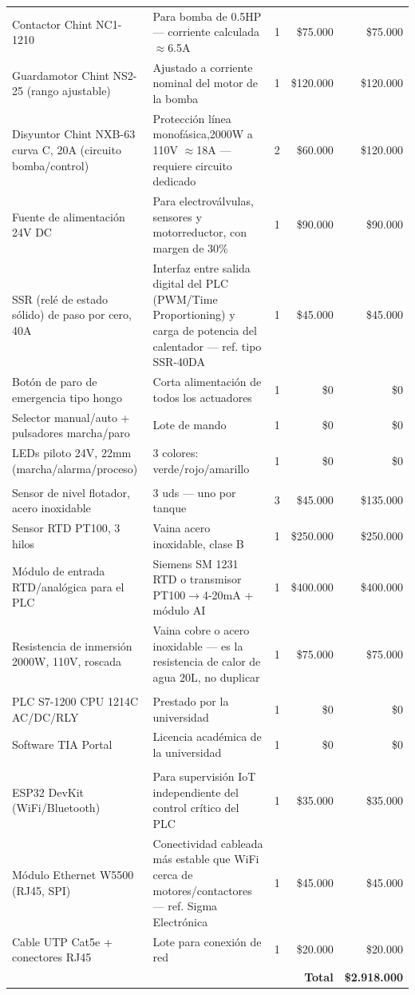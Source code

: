 \begin{longtable}{@{}p{4.6cm}p{6cm}crr@{}}
\addlinespace[2pt]
Contactor Chint NC1-1210 & Para bomba de 0.5HP --- corriente calculada $\approx$6.5A & 1 & \$75.000 & \$75.000 \\
Guardamotor Chint NS2-25 (rango ajustable) & Ajustado a corriente nominal del motor de la bomba & 1 & \$120.000 & \$120.000 \\
Disyuntor Chint NXB-63 curva C, 20A (circuito bomba/control) & Protección línea monofásica,2000W a 110V $\approx$18A --- requiere circuito dedicado & 2 & \$60.000 & \$120.000 \\
Fuente de alimentación 24V DC & Para electroválvulas, sensores y motorreductor, con margen de 30\% & 1 & \$90.000 & \$90.000 \\
SSR (relé de estado sólido) de paso por cero, 40A & Interfaz entre salida digital del PLC (PWM/Time Proportioning) y carga de potencia del calentador --- ref. tipo SSR-40DA & 1 & \$45.000 & \$45.000 \\
Botón de paro de emergencia tipo hongo & Corta alimentación de todos los actuadores & 1 & \$0 & \$0 \\
Selector manual/auto + pulsadores marcha/paro & Lote de mando & 1 & \$0 & \$0 \\
LEDs piloto 24V, 22mm (marcha/alarma/proceso) & 3 colores: verde/rojo/amarillo & 1 & \$0 & \$0 \\
\addlinespace
\multicolumn{5}{@{}l}{\textbf{Instrumentación}} \\
\addlinespace[2pt]
Sensor de nivel flotador, acero inoxidable & 3 uds --- uno por tanque & 3 & \$45.000 & \$135.000 \\
Sensor RTD PT100, 3 hilos & Vaina acero inoxidable, clase B & 1 & \$250.000 & \$250.000 \\
Módulo de entrada RTD/analógica para el PLC & Siemens SM 1231 RTD o transmisor PT100$\rightarrow$4-20mA + módulo AI & 1 & \$400.000 & \$400.000 \\
Resistencia de inmersión 2000W, 110V, roscada & Vaina cobre o acero inoxidable --- es la resistencia de calor de agua 20L, no duplicar & 1 & \$75.000 & \$75.000 \\
\addlinespace
\multicolumn{5}{@{}l}{\textbf{Control}} \\
\addlinespace[2pt]
PLC S7-1200 CPU 1214C AC/DC/RLY & Prestado por la universidad & 1 & \$0 & \$0 \\
Software TIA Portal & Licencia académica de la universidad & 1 & \$0 & \$0 \\
\addlinespace
\multicolumn{5}{@{}l}{\textbf{Comunicaciones / IoT}} \\
\addlinespace[2pt]
ESP32 DevKit (WiFi/Bluetooth) & Para supervisión IoT independiente del control crítico del PLC & 1 & \$35.000 & \$35.000 \\
Módulo Ethernet W5500 (RJ45, SPI) & Conectividad cableada más estable que WiFi cerca de motores/contactores --- ref. Sigma Electrónica & 1 & \$45.000 & \$45.000 \\
Cable UTP Cat5e + conectores RJ45 & Lote para conexión de red & 1 & \$20.000 & \$20.000 \\
\midrule
\multicolumn{4}{r}{\textbf{Total}} & \textbf{\$2.918.000} \\
\end{longtable}